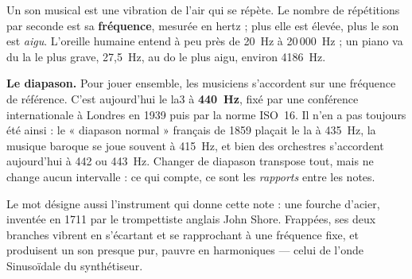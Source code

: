 \documentclass[a4paper,11pt]{article}
\newcommand{\touche}[1]{\textsf{\small #1}}   %
\begin{document}
Un son musical est une vibration de l'air qui se répète. Le nombre de
répétitions par seconde est sa \textbf{fréquence}, mesurée en hertz ; plus
elle est élevée, plus le son est \emph{aigu}. L'oreille humaine entend à peu
près de 20~Hz à 20\,000~Hz ; un piano va du la le plus grave, 27,5~Hz, au do
le plus aigu, environ 4186~Hz.

\textbf{Le diapason.} Pour jouer ensemble, les musiciens s'accordent sur une
fréquence de référence. C'est aujourd'hui le la3 à \textbf{440~Hz}, fixé par
une conférence internationale à Londres en 1939 puis par la norme ISO~16. Il
n'en a pas toujours été ainsi : le « diapason normal » français de 1859
plaçait le la à 435~Hz, la musique baroque se joue souvent à 415~Hz, et bien
des orchestres s'accordent aujourd'hui à 442 ou 443~Hz. Changer de diapason
transpose tout, mais ne change aucun intervalle : ce qui compte, ce sont les
\emph{rapports} entre les notes.

Le mot désigne aussi l'instrument qui donne cette note : une fourche d'acier,
inventée en 1711 par le trompettiste anglais John Shore. Frappées, ses deux
branches vibrent en s'écartant et se rapprochant à une fréquence fixe, et
produisent un son presque pur, pauvre en harmoniques --- celui de l'onde
\touche{Sinusoïdale} du synthétiseur.
\end{document}
